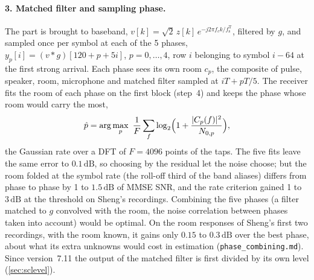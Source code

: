 \documentclass[11pt,a4paper]{article}
\newcommand{\dB}{\,\mathrm{dB}}
\newcommand{\code}[1]{\texttt{#1}}
\newcommand{\fsT}{f_{\mathrm{s}}^{\mathrm{T}}}
\theoremstyle{remark}
\begin{document}
\paragraph{3. Matched filter and sampling phase.}
The part is brought to baseband, $v[k] = \sqrt2\, z[k]\, e^{-j2\pi f_c k/\fsT}$, filtered by $g$, and sampled once per symbol at each of the 5 phases, $y_p[i] = (v * g)[120 + p + 5i]$, $p = 0, \dots, 4$, row $i$ belonging to symbol $i - 64$ at the first strong arrival. Each phase sees its own room $c_p$, the composite of pulse, speaker, room, microphone and matched filter sampled at $iT + pT/5$. The receiver fits the room of each phase on the first block (step~4) and keeps the phase whose room would carry the most,
\begin{equation}
\hat p = \arg\max_p\ \frac{1}{F}\sum_{f} \log_2\Bigl(1 + \frac{|C_p(f)|^2}{N_{0,p}}\Bigr),
\end{equation}
the Gaussian rate over a DFT of $F = 4096$ points of the taps. The five fits leave the same error to $0.1\dB$, so choosing by the residual let the noise choose; but the room folded at the symbol rate (the roll-off third of the band aliases) differs from phase to phase by 1 to $1.5\dB$ of MMSE SNR, and the rate criterion gained 1 to $3\dB$ at the threshold on Sheng's recordings. Combining the five phases (a filter matched to $g$ convolved with the room, the noise correlation between phases taken into account) would be optimal. On the room responses of Sheng's first two recordings, with the room known, it gains only $0.15$ to $0.3\dB$ over the best phase, about what its extra unknowns would cost in estimation (\code{phase\_combining.md}). Since version~7.11 the output of the matched filter is first divided by its own level (\cref{sec:sclevel}).
\end{document}
